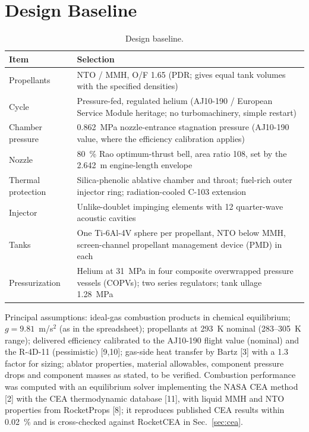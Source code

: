 \documentclass[10pt]{article}
\begin{document}
\section{Design Baseline}
\begin{table}[H]\centering\small\caption{Design baseline.}\label{tab:base}
\begin{tabular}{lp{11.2cm}}\toprule
Item & Selection \\\midrule
Propellants & NTO / MMH, O/F 1.65 (PDR; gives equal tank volumes with the specified densities) \\
Cycle & Pressure-fed, regulated helium (AJ10-190 / European Service Module heritage; no turbomachinery, simple restart) \\
Chamber pressure & 0.862~MPa nozzle-entrance stagnation pressure (AJ10-190 value, where the efficiency calibration applies) \\
Nozzle & 80~\% Rao optimum-thrust bell, area ratio 108, set by the 2.642~m engine-length envelope \\
Thermal protection & Silica-phenolic ablative chamber and throat; fuel-rich outer injector ring; radiation-cooled C-103 extension \\
Injector & Unlike-doublet impinging elements with 12 quarter-wave acoustic cavities \\
Tanks & One Ti-6Al-4V sphere per propellant, NTO below MMH, screen-channel propellant management device (PMD) in each \\
Pressurization & Helium at 31~MPa in four composite overwrapped pressure vessels (COPVs); two series regulators; tank ullage 1.28~MPa \\
\bottomrule\end{tabular}\end{table}

Principal assumptions: ideal-gas combustion products in chemical equilibrium; $g = 9.81$~m/s$^2$ (as in the
spreadsheet); propellants at 293~K nominal (283--305~K range); delivered efficiency calibrated to the AJ10-190 flight
value (nominal) and the R-4D-11 (pessimistic) [9,10]; gas-side heat transfer by Bartz [3] with a 1.3 factor for
sizing; ablator properties, material allowables, component pressure drops and component masses as stated, to be
verified. Combustion performance was computed with an equilibrium solver implementing the NASA CEA method [2] with the
CEA thermodynamic database [11], with liquid MMH and NTO properties from RocketProps [8]; it reproduces published CEA results within 0.02~\% and is cross-checked against
RocketCEA in Sec.~\ref{sec:cea}.
\end{document}

